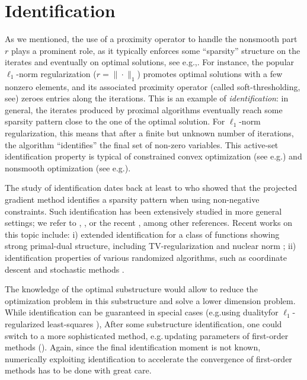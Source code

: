 \section{Identification}\label{sec:basics_identificationn}
As we mentioned, the use of a proximity operator to handle the nonsmooth part $r$ plays a prominent role, as it typically enforces some ``sparsity'' structure on the iterates and eventually on optimal solutions, see e.g.,\;\cite{vaiter2015model}. For instance, the popular $\ell_1$-norm regularization ($r=\|\cdot\|_1$) promotes optimal solutions with a few nonzero elements, and its associated proximity operator (called soft-thresholding, see\;\cite{donoho1995noising}) zeroes entries along the iterations. This is an example of \emph{identification}: in general, the iterates produced by proximal algorithms eventually reach some sparsity pattern close to the one of the optimal solution. For $\ell_1$-norm regularization, this means that after a finite but unknown number of iterations, the algorithm ``identifies'' the final set of non-zero variables. This active-set identification property is typical of constrained convex optimization (see e.g.\;\cite{wright1993identifiable}) and nonsmooth optimization (see e.g.\;\cite{hare2004identifying}).

The study of identification dates back at least to \cite{bertsekas1976goldstein} who showed that the projected gradient method identifies a sparsity pattern when using non-negative constraints. Such identification has been extensively studied in more general settings; we refer to \cite{burke1988identification}, \cite{lewis2002active}, \cite{drusvyatskiy2014optimality} or the recent \cite{lewis2018partial}, among other references.
Recent works on this topic include: i) extended identification for a class of functions showing strong primal-dual structure, including TV-regularization and nuclear norm \cite{fadili2018sensitivity}; ii) identification properties of various randomized algorithms, such as coordinate descent \cite{wright2012accelerated} and stochastic methods \cite{poon2018local,fadili2018model,sun2019we}.

The knowledge of the optimal substructure would allow to reduce the optimization problem in this substructure and solve a lower dimension problem. While identification can be guaranteed in special cases  (e.g.\;using duality\;for $\ell_1$-regularized least-squares \cite{ogawa2013safe, fercoq2015mind}), 
%  
After some substructure identification, one could switch to a more sophisticated method, e.g.\,updating parameters of first-order methods (\cite{liang2017activity}).
Again, since the final identification moment is not known, numerically exploiting identification to accelerate the convergence of first-order methods has to be done with great care.

